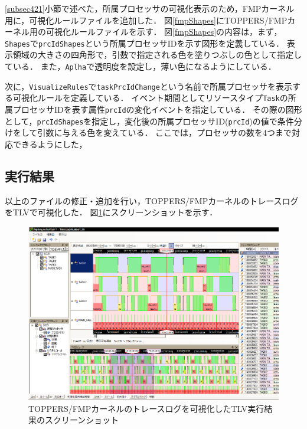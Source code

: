 \ref{subsec421}小節で述べた，所属プロセッサの可視化表示のため，FMPカーネル用に，可視化ルールファイルを追加した．
図\ref{fmpShapes}にTOPPERS/FMPカーネル用の可視化ルールファイルを示す．
図\ref{fmpShapes}の内容は，まず，{\tt Shapes}で{\tt prcIdShapes}という所属プロセッサIDを示す図形を定義している．
表示領域の大きさの四角形で，引数で指定される色を塗りつぶしの色として指定している．
また，{\tt Aplha}で透明度を設定し，薄い色になるようにしている．

次に，{\tt VisualizeRules}で{\tt taskPrcIdChange}という名前で所属プロセッサを表示する可視化ルールを定義している．
イベント期間としてリソースタイプ{\tt Task}の所属プロセッサIDを表す属性{\tt prcId}の変化イベントを指定している．
その際の図形として，{\tt prcIdShapes}を指定し，変化後の所属プロセッサID({\tt prcId})の値で条件分けをして引数に与える色を変えている．
ここでは，プロセッサの数を4つまで対応できるようにした，

\subsection{実行結果}

以上のファイルの修正・追加を行い，TOPPERS/FMPカーネルのトレースログをTLVで可視化した．
図\ref{fig:fmpTLVscreenShot}にスクリーンショットを示す．

\begin{figure}[t]
\begin{center}
\includegraphics[width=15cm]{img/fmpTLVscreenShot.eps}
\caption{TOPPERS/FMPカーネルのトレースログを可視化したTLV実行結果のスクリーンショット}
\label{fig:fmpTLVscreenShot}
\end{center}
\end{figure}

